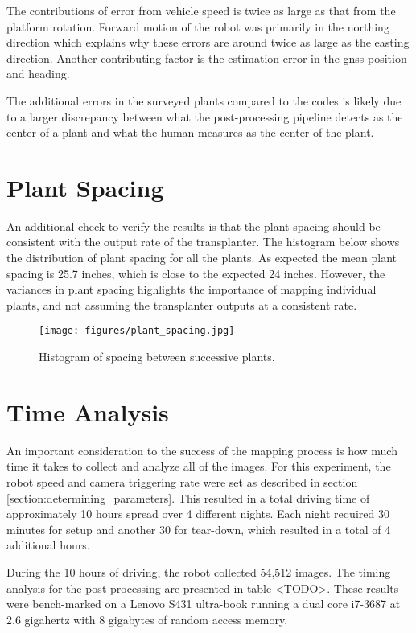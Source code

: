 The contributions of error from vehicle speed is twice as large as that from the platform rotation. Forward motion of the robot was primarily in the northing direction which explains why these errors are around twice as large as the easting direction.  Another contributing factor is the estimation error in the \ac{gnss} position and heading.

The additional errors in the surveyed plants compared to the codes is likely due to a larger discrepancy between what the post-processing pipeline detects as the center of a plant and what the human measures as the center of the plant. 

\section{Plant Spacing}

An additional check to verify the results is that the plant spacing should be consistent with the output rate of the transplanter.  The histogram below shows the distribution of plant spacing for all the plants.  As expected the mean plant spacing is 25.7 inches, which is close to the expected 24 inches. However, the variances in plant spacing highlights the importance of mapping individual plants, and not assuming the transplanter outputs at a consistent rate.

\begin{figure}[htb]
	\centering
    \texttt{[image: figures/plant\_spacing.jpg]}
    \caption[Plant spacing histogram]{Histogram of spacing between successive plants.}
    \label{figure:plant_spacing}
\end{figure}

\section{Time Analysis}

An important consideration to the success of the mapping process is how much time it takes to collect and analyze all of the images. For this experiment, the robot speed and camera triggering rate were set as described in section \ref{section:determining_parameters}.  This resulted in a total driving time of approximately 10 hours spread over 4 different nights.  Each night required 30 minutes for setup and another 30 for tear-down, which resulted in a total of 4 additional hours.  

During the 10 hours of driving, the robot collected 54,512 images.  The timing analysis for the post-processing are presented in table <TODO>. These results were bench-marked on a Lenovo S431 ultra-book running a dual core i7-3687 at 2.6 gigahertz with 8 gigabytes of random access memory.  

